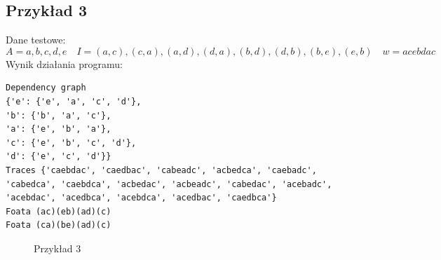 \documentclass{article}
\begin{document}
    \subsection{Przykład 3}
        Dane testowe:
        $$
        A = {a, b, c, d, e}\quad
        I = {(a, c), (c, a), (a, d), (d, a), (b, d), (d, b), (b, e), (e, b)}\quad
        w = acebdac
        $$
        Wynik działania programu:
        \begin{lstlisting}
Dependency graph 
{'e': {'e', 'a', 'c', 'd'}, 
'b': {'b', 'a', 'c'}, 
'a': {'e', 'b', 'a'}, 
'c': {'e', 'b', 'c', 'd'}, 
'd': {'e', 'c', 'd'}}
Traces {'caebdac', 'caedbac', 'cabeadc', 'acbedca', 'caebadc', 'cabedca', 'caebdca', 'acbedac', 'acbeadc', 'cabedac', 'acebadc', 'acebdac', 'acedbca', 'acebdca', 'acedbac', 'caedbca'}
Foata (ac)(eb)(ad)(c)
Foata (ca)(be)(ad)(c)
        \end{lstlisting}
        \begin{figure}[h!]
            \centering
            \caption{Przykład 3}
        \end{figure}
\end{document}
